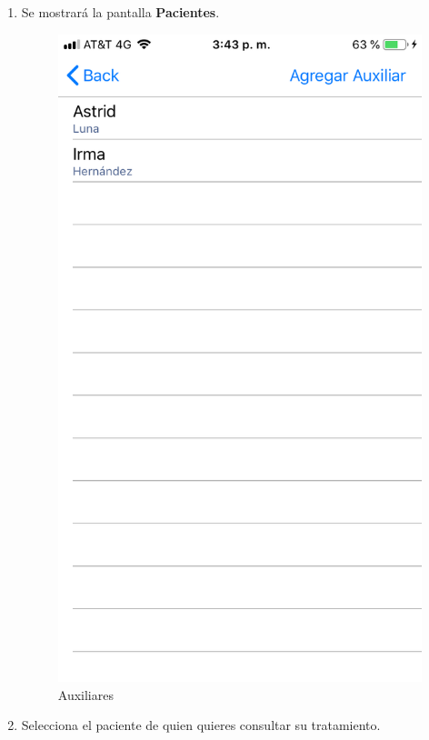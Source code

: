 \begin{enumerate}
	\item Se mostrará la pantalla \textbf{Pacientes}. 
	\newpage
	\begin{figure}[!htbp]			
		\hypertarget{fig:Auxiliares}{\hspace{1pt}}
		\begin{center}
			\includegraphics[height=0.4\textheight]{Paciente/AgregarAuxiliar/images/Auxiliares}
			\caption{Auxiliares}
			\label{fig:Auxiliares}
		\end{center}
	\end{figure}

	\item Selecciona el paciente de quien quieres consultar su tratamiento.


\end{enumerate}

